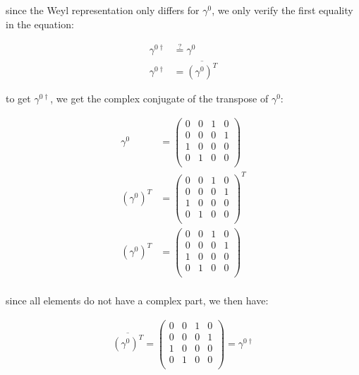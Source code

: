 \documentclass[11pt]{article}
\theoremstyle{definition}
\begin{document}
since the Weyl representation only differs for $\gamma^0$, we only verify the first equality in the equation:

\begin{align}
    \gamma^{0\dagger} &\stackrel{?}{=} \gamma^{0}\\
    \gamma^{0\dagger} &= \overline{(\gamma^{0})^{T}}
\end{align}

to get $\gamma^{0\dagger}$, we get the complex conjugate of the transpose of $\gamma^{0}$:

\begin{align}
    \gamma^{0} &= 
    \begin{pmatrix}
        0 & 0 & 1 & 0\\
        0 & 0 & 0 & 1\\
        1 & 0 & 0 & 0\\
        0 & 1 & 0 & 0\\
    \end{pmatrix}\\
    (\gamma^{0})^{T} &=
    \begin{pmatrix}
        0 & 0 & 1 & 0\\
        0 & 0 & 0 & 1\\
        1 & 0 & 0 & 0\\
        0 & 1 & 0 & 0\\
    \end{pmatrix}^T\\
    (\gamma^{0})^{T} &=
    \begin{pmatrix}
        0 & 0 & 1 & 0\\
        0 & 0 & 0 & 1\\
        1 & 0 & 0 & 0\\
        0 & 1 & 0 & 0\\
    \end{pmatrix}\\
\end{align}

since all elements do not have a complex part, we then have:

\begin{align}
    \overline{(\gamma^{0})^{T}} =
    \begin{pmatrix}
        0 & 0 & 1 & 0\\
        0 & 0 & 0 & 1\\
        1 & 0 & 0 & 0\\
        0 & 1 & 0 & 0\\
    \end{pmatrix} = \gamma^{0\dagger}\\
\end{align}
\end{document}
